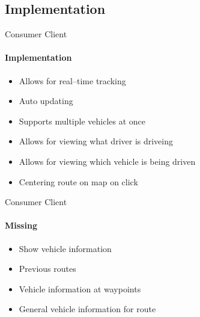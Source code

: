 \subsection{Implementation}

\begin{frame}{Consumer Client}
    \framesubtitle{Implementation}
    \begin{itemize}
        \item Allows for real--time tracking
        \item Auto updating
        \item Supports multiple vehicles at once
        \item Allows for viewing what driver is driveing
        \item Allows for viewing which vehicle is being driven
        \item Centering route on map on click
    \end{itemize}
\end{frame}

\begin{frame}{Consumer Client}
    \framesubtitle{Missing}

    \begin{itemize}
        \item Show vehicle information
        \item Previous routes
        \item Vehicle information at waypoints
        \item General vehicle information for route
    \end{itemize}
\end{frame}

